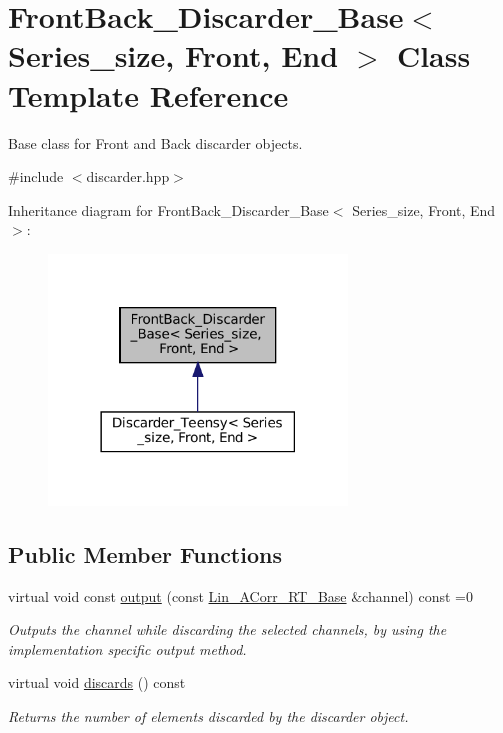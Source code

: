 \hypertarget{classFrontBack__Discarder__Base}{}\section{Front\+Back\+\_\+\+Discarder\+\_\+\+Base$<$ Series\+\_\+size, Front, End $>$ Class Template Reference}
\label{classFrontBack__Discarder__Base}


Base class for Front and Back discarder objects.  




{\ttfamily \#include $<$discarder.\+hpp$>$}



Inheritance diagram for Front\+Back\+\_\+\+Discarder\+\_\+\+Base$<$ Series\+\_\+size, Front, End $>$\+:\nopagebreak
\begin{figure}[H]
\begin{center}
\leavevmode
\includegraphics[width=225pt]{classFrontBack__Discarder__Base__inherit__graph}
\end{center}
\end{figure}
\subsection*{Public Member Functions}
\begin{DoxyCompactItemize}
\item 
virtual void const \hyperlink{classFrontBack__Discarder__Base_ab8a1d0082f223c31da3c1374c520c4c4}{output} (const \hyperlink{classLin__ACorr__RT__Base}{Lin\+\_\+\+A\+Corr\+\_\+\+R\+T\+\_\+\+Base} \&channel) const =0
\begin{DoxyCompactList}\small\item\em Outputs the channel while discarding the selected channels, by using the implementation specific output method. \end{DoxyCompactList}\item 
virtual void \hyperlink{classFrontBack__Discarder__Base_a9cc129dd2be2f0894646a3db2aa2bebc}{discards} () const
\begin{DoxyCompactList}\small\item\em Returns the number of elements discarded by the discarder object. \end{DoxyCompactList}\end{DoxyCompactItemize}


